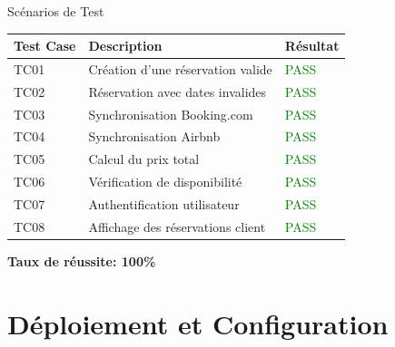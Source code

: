 \documentclass[aspectratio=169]{beamer}
\begin{document}
\begin{frame}{Scénarios de Test}
    \begin{table}
        \centering
        \small
        \begin{tabular}{|l|p{5cm}|l|}
            \hline
            \textbf{Test Case} & \textbf{Description} & \textbf{Résultat} \\
            \hline
            TC01 & Création d'une réservation valide & \textcolor{green}{PASS} \\
            \hline
            TC02 & Réservation avec dates invalides & \textcolor{green}{PASS} \\
            \hline
            TC03 & Synchronisation Booking.com & \textcolor{green}{PASS} \\
            \hline
            TC04 & Synchronisation Airbnb & \textcolor{green}{PASS} \\
            \hline
            TC05 & Calcul du prix total & \textcolor{green}{PASS} \\
            \hline
            TC06 & Vérification de disponibilité & \textcolor{green}{PASS} \\
            \hline
            TC07 & Authentification utilisateur & \textcolor{green}{PASS} \\
            \hline
            TC08 & Affichage des réservations client & \textcolor{green}{PASS} \\
            \hline
        \end{tabular}
    \end{table}
    
    \vspace{10pt}
    \textbf{Taux de réussite: 100\%}
\end{frame}

\section{Déploiement et Configuration}
\end{document}
